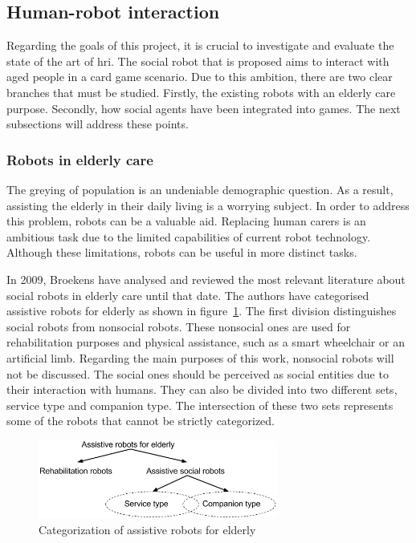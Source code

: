 \subsection{Human-robot interaction}

Regarding the goals of this project, it is crucial to investigate and evaluate the state of the art of \gls{hri}.
The social robot that is proposed aims to interact with aged people in a card game scenario.
Due to this ambition, there are two clear branches that must be studied.
Firstly, the existing robots with an elderly care purpose.
Secondly, how social agents have been integrated into games.
The next subsections will address these points.



\subsubsection{Robots in elderly care}


The greying of population is an undeniable demographic question.
As a result, assisting the elderly in their daily living is a worrying subject.
In order to address this problem, robots can be a valuable aid.
Replacing human carers is an ambitious task due to the limited capabilities of current robot technology.
Although these limitations, robots can be useful in more distinct tasks.

In 2009, Broekens have analysed and reviewed the most relevant literature about social robots in elderly care until that date.
The authors have categorised assistive robots for elderly as shown in figure~\ref{fig:categorization}.
The first division distinguishes social robots from nonsocial robots.
These nonsocial ones are used for rehabilitation purposes and physical assistance, such as a smart wheelchair or an artificial limb.
Regarding the main purposes of this work, nonsocial robots will not be discussed.
The social ones should be perceived as social entities due to their interaction with humans.
They can also be divided into two different sets, service type and companion type.
The intersection of these two sets represents some of the robots that cannot be strictly categorized.

\begin{figure}[h!]
  \centering
    \includegraphics[width=0.7\textwidth]{./img/categorization_robots}
  \caption{Categorization of assistive robots for elderly}
\label{fig:categorization}
\end{figure}

